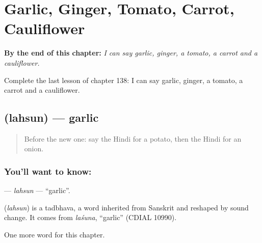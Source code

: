 
\chapter{Garlic, Ginger, Tomato, Carrot, Cauliflower}
\label{ch:hi-garlic-ginger-tomato-carrot-cauliflower}

\begin{chapteropening}
\textbf{By the end of this chapter:} \emph{I can say garlic, ginger, a tomato, a carrot and a cauliflower.}

Complete the last lesson of chapter 138: I can say garlic, ginger, a tomato, a carrot and a cauliflower.
\end{chapteropening}

\section[\texorpdfstring{\hi{लहसुन} (lahsun)}{लहसुन (lahsun)}]{ (lahsun) — garlic}

\label{lesson:HI-C138-lahsun}



\begin{quote}
Before the new one: say the Hindi for a potato, then the Hindi for an onion.
\end{quote}

\subsection*{You'll want to know: }
\textbf{} — \emph{lahsun} — \textquotedblleft{}garlic\textquotedblright{}.

\begin{cousinweb}
\textbf{} (\emph{lahsun}) is a tadbhava, a word inherited from Sanskrit and reshaped by sound change. It comes from \emph{laśuna}, \textquotedblleft{}garlic\textquotedblright{} (CDIAL 10990).
\end{cousinweb}

\begin{grammarlens}[title={What you've built}]
One more word for this chapter.
\end{grammarlens}

